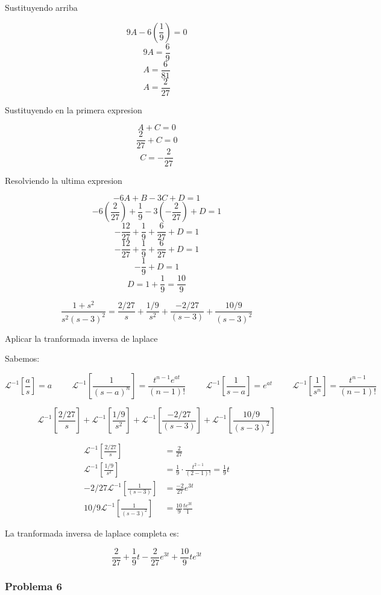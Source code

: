 \documentclass{article}
\begin{document}
Sustituyendo arriba

\[9A - 6(\frac{1}{9}) = 0\]
\[9A = \frac{6}{9}\]
\[A = \frac{6}{81}\]
\[A = \frac{2}{27}\]

Sustituyendo en la primera expresion

\[A + C = 0\]
\[\frac{2}{27} + C = 0\]
\[ C = -\frac{2}{27}\]

Resolviendo la ultima expresion

\[-6A+B-3C+D = 1\]
\[-6(\frac{2}{27})+\frac{1}{9}-3(-\frac{2}{27})+D = 1\]
\[-\frac{12}{27} + \frac{1}{9} + \frac{6}{27} + D = 1\]
\[-\frac{12}{27} + \frac{1}{9} + \frac{6}{27} + D = 1\]
\[-\frac{1}{9} + D = 1\]
\[ D = 1 + \frac{1}{9} = \frac{10}{9}\]

\[\frac{1+s^2}{s^2(s-3)^2} = \frac{2/27}{s} + \frac{1/9}{s^2} + \frac{-2/27}{(s-3)} + \frac{10/9}{(s-3)^2}\]

Aplicar la tranformada inversa de laplace

Sabemos:

\[ \mathcal{L}^{-1}[\frac{a}{s}] = a \hspace{1cm} \mathcal{L}^{-1}[\frac{1}{(s-a)^n}] = \frac{t^{n-1}e^{at}}{(n-1)!} \hspace{1cm} \mathcal{L}^{-1}[\frac{1}{s-a}] = e^{at} \hspace{1cm} \mathcal{L}^{-1}\left[\frac{1}{s^n}\right] = \frac{t^{n-1}}{(n-1)!}
\]

\[\mathcal{L}^{-1}[\frac{2/27}{s}] + \mathcal{L}^{-1}[\frac{1/9}{s^2}] + \mathcal{L}^{-1}[\frac{-2/27}{(s-3)}] + \mathcal{L}^{-1}[\frac{10/9}{(s-3)^2}]\]

\begin{align*}
    \mathcal{L}^{-1}[\frac{2/27}{s}]        & = \frac{2}{27}                                            \\
    \mathcal{L}^{-1}[\frac{1/9}{s^2}]       & = \frac{1}{9} \cdot \frac{t^{2-1}}{(2-1)!} = \frac{1}{9}t \\
    -2/27\mathcal{L}^{-1}[\frac{1}{(s-3)}]  & = \frac{-2}{27}e^{3t}                                     \\
    10/9\mathcal{L}^{-1}[\frac{1}{(s-3)^2}] & = \frac{10}{9}\frac{te^{3t}}{1}
\end{align*}

La tranformada inversa de laplace completa es:

\[\frac{2}{27} + \frac{1}{9}t - \frac{2}{27}e^{3t} + \frac{10}{9}te^{3t}
\]
\newpage


\subsubsection{Problema 6}
\end{document}
